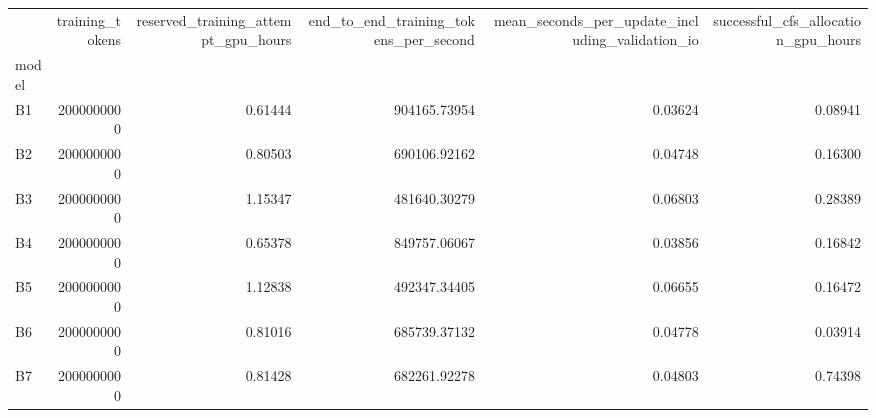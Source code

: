\begin{tabular}{lrrrrr}
\toprule
 & training_tokens & reserved_training_attempt_gpu_hours & end_to_end_training_tokens_per_second & mean_seconds_per_update_including_validation_io & successful_cfs_allocation_gpu_hours \\
model &  &  &  &  &  \\
\midrule
B1 & 2000000000 & 0.61444 & 904165.73954 & 0.03624 & 0.08941 \\
B2 & 2000000000 & 0.80503 & 690106.92162 & 0.04748 & 0.16300 \\
B3 & 2000000000 & 1.15347 & 481640.30279 & 0.06803 & 0.28389 \\
B4 & 2000000000 & 0.65378 & 849757.06067 & 0.03856 & 0.16842 \\
B5 & 2000000000 & 1.12838 & 492347.34405 & 0.06655 & 0.16472 \\
B6 & 2000000000 & 0.81016 & 685739.37132 & 0.04778 & 0.03914 \\
B7 & 2000000000 & 0.81428 & 682261.92278 & 0.04803 & 0.74398 \\
\bottomrule
\end{tabular}

